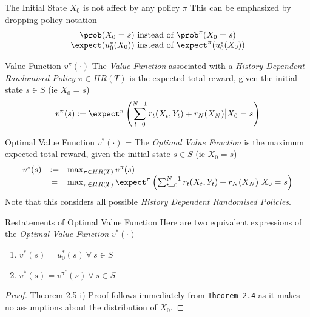 \documentclass[11pt,a4paper]{article}
\begin{document}
  \begin{remark}{The Initial State $X_0$ is not affect by any policy $\pi$}
    This can be emphasized by dropping policy notation
    \[\begin{array}{c}
      \prob(X_0=s)\text{ instead of }\prob^\pi(X_0=s)\\
      \expect(u_0^*(X_0))\text{ instead of }\expect^\pi(u_0^*(X_0))
    \end{array}\]
  \end{remark}

  \begin{definition}{Value Function $v^\pi(\cdot)$}
    The \textit{Value Function} associated with a \textit{History Dependent Randomised Policy} $\pi\in HR(T)$ is the expected total reward, given the initial state $s\in S$ (ie $X_0=s$)
    \[ v^\pi(s):=\expect^\pi\left(\sum_{t=0}^{N-1}r_t(X_t,Y_t)+r_N(X_N)\big|X_0=s\right) \]
  \end{definition}

  \begin{definition}{Optimal Value Function $v^*(\cdot)$}
    \everymath={\displaystyle}
    The \textit{Optimal Value Function} is the maximum expected total reward, given the initial state $s\in S$ (ie $X_0=s$)
    \[\begin{array}{rcl}
      v^*(s)&:=&\max_{\pi\in HR(T)}v^\pi(s)\\
      &=&\max_{\pi\in HR(T)}\expect^\pi\left(\sum_{t=0}^{N-1}r_t(X_t,Y_t)+r_N(X_N)\big|X_0=s\right)
    \end{array}\]
    Note that this considers all possible \textit{History Dependent Randomised Policies}.
  \end{definition}

  \begin{theorem}{Restatements of Optimal Value Function}
    Here are two equivalent expressions of the \textit{Optimal Value Function} $v^*(\cdot)$
    \begin{enumerate}
      \item $v^*(s)=u_0^*(s)\ \forall\ s\in S$
      \item $v^*(s)=v^{\pi^*}(s)\ \forall\ s\in S$
    \end{enumerate}
  \end{theorem}

  \begin{proof}{Theorem 2.5 i)}
    Proof follows immediately from \texttt{Theorem 2.4} as it makes no assumptions about the distribution of $X_0$.
  \end{proof}
\end{document}
